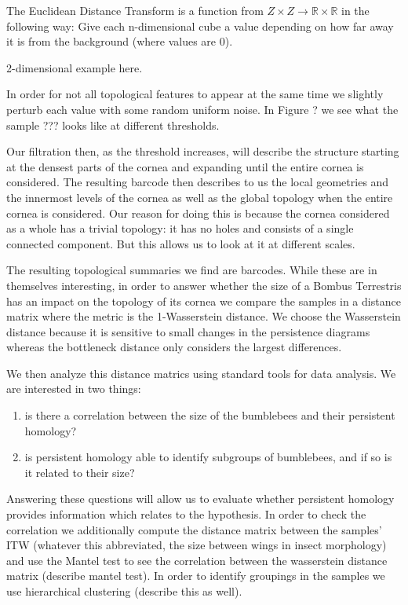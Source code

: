\begin{definition}
  The Euclidean Distance Transform is a function from $Z \times Z \to \mathbb{R} \times \mathbb{R}$ in the following way: Give each n-dimensional cube a value depending on how far away it is from the background (where values are 0).
\end{definition}

2-dimensional example here.

In order for not all topological features to appear at the same time we slightly perturb each value with some random uniform noise. In Figure ? we see what the sample ??? looks like at different thresholds.

Our filtration then, as the threshold increases, will describe the structure starting at the densest parts of the cornea and expanding until the entire cornea is considered. The resulting barcode then describes to us the local geometries and the innermost levels of the cornea as well as the global topology when the entire cornea is considered. Our reason for doing this is because the cornea considered as a whole has a trivial topology: it has no holes and consists of a single connected component. But this allows us to look at it at different scales.

The resulting topological summaries we find are barcodes. While these are in themselves interesting, in order to answer whether the size of a Bombus Terrestris has an impact on the topology of its cornea we compare the samples in a distance matrix where the metric is the 1-Wasserstein distance. We choose the Wasserstein distance because it is sensitive to small changes in the persistence diagrams whereas the bottleneck distance only considers the largest differences.

We then analyze this distance matrics using standard tools for data analysis. We are interested in two things:
\begin{enumerate}
  \item is there a correlation between the size of the bumblebees and their persistent homology?
  \item is persistent homology able to identify subgroups of bumblebees, and if so is it related to their size?
\end{enumerate}
Answering these questions will allow us to evaluate whether persistent homology provides information which relates to the hypothesis. In order to check the correlation we additionally compute the distance matrix between the samples' ITW (whatever this abbreviated, the size between wings in insect morphology) and use the Mantel test to see the correlation between the wasserstein distance matrix (describe mantel test). In order to identify groupings in the samples we use hierarchical clustering (describe this as well).
